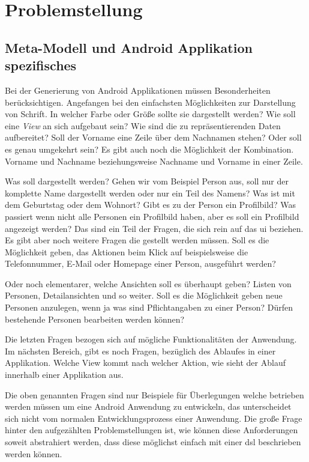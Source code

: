 \chapter{Problemstellung} \label{ch:problem}
\section{Meta-Modell und Android Applikation spezifisches}
Bei der Generierung von Android Applikationen müssen Besonderheiten berücksichtigen. Angefangen bei den einfachsten Möglichkeiten zur Darstellung von Schrift. In welcher Farbe oder Größe sollte sie dargestellt werden? 
Wie soll eine \textit{View} an sich aufgebaut sein? Wie sind die zu repräsentierenden Daten aufbereitet?
Soll der Vorname eine Zeile über dem Nachnamen stehen? Oder soll es genau umgekehrt sein? Es gibt auch noch die Möglichkeit der Kombination. Vorname und Nachname beziehungsweise Nachname und Vorname in einer Zeile. 

Was soll dargestellt werden? Gehen wir vom Beispiel Person aus, soll nur der komplette Name dargestellt werden oder nur ein Teil des Namens? Was ist mit dem Geburtstag oder dem Wohnort? Gibt es zu der Person ein Profilbild? Was passiert wenn nicht alle Personen ein Profilbild haben, aber es soll ein Profilbild angezeigt werden? 
Das sind ein Teil der Fragen, die sich rein auf das \acf{ui} beziehen. Es gibt aber noch weitere Fragen die gestellt werden müssen. Soll es die Möglichkeit geben, das Aktionen beim Klick auf beispielsweise die Telefonnummer, E-Mail oder Homepage einer Person, ausgeführt werden?

Oder noch elementarer, welche Ansichten soll es überhaupt geben? Listen von Personen, Detailansichten und so weiter. 
Soll es die Möglichkeit geben neue Personen anzulegen, wenn ja was sind Pflichtangaben zu einer Person?
Dürfen bestehende Personen bearbeiten werden können?

Die letzten Fragen bezogen sich auf mögliche Funktionalitäten der Anwendung. Im nächsten Bereich, gibt es noch Fragen, bezüglich des Ablaufes in einer Applikation. Welche View kommt nach welcher Aktion, wie sieht der Ablauf innerhalb einer Applikation aus.

\newpage
Die oben genannten Fragen sind nur Beispiele für Überlegungen welche betrieben werden müssen um eine Android Anwendung zu entwickeln, das unterscheidet sich nicht vom normalen Entwicklungsprozess einer Anwendung.
Die große Frage hinter den aufgezählten Problemstellungen ist, wie können diese Anforderungen soweit abstrahiert werden, dass diese möglichst einfach mit einer \acf{dsl} beschrieben werden können.


